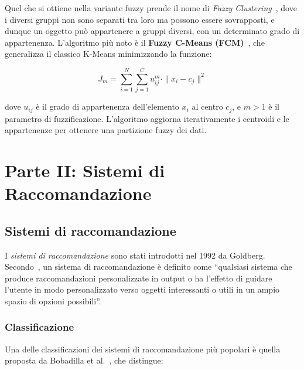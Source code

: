 Quel che si ottiene nella variante fuzzy prende il nome di \textit{Fuzzy Clustering}~\cite{dunn1973fuzzy}, dove i diversi gruppi non sono separati tra loro ma possono essere sovrapposti, e dunque un oggetto può appartenere a gruppi diversi, con un determinato grado di appartenenza. L’algoritmo più noto è il \textbf{Fuzzy C-Means (FCM)}~\cite{BEZDEK1984191}, che generalizza il classico K-Means minimizzando la funzione:

\[
J_m = \sum_{i=1}^{N} \sum_{j=1}^{C} u_{ij}^m \cdot \|x_i - c_j\|^2
\]

dove $u_{ij}$ è il grado di appartenenza dell’elemento $x_i$ al centro $c_j$, e $m > 1$ è il parametro di fuzzificazione. L’algoritmo aggiorna iterativamente i centroidi e le appartenenze per ottenere una partizione fuzzy dei dati.


\section{Parte II: Sistemi di Raccomandazione}

\subsection{Sistemi di raccomandazione}

I \textit{sistemi di raccomandazione} sono stati introdotti nel 1992 da Goldberg\cite{10.1145/138859.138867}. Secondo~\cite{burke2002hybrid}, un sistema di raccomandazione è definito come ``qualsiasi sistema che produce raccomandazioni personalizzate in output o ha l’effetto di guidare l’utente in modo personalizzato verso oggetti interessanti o utili in un ampio spazio di opzioni possibili''. 

\subsubsection{Classificazione}

Una delle classificazioni dei sistemi di raccomandazione più popolari è quella proposta da Bobadilla et al.~\cite{21}, che distingue:

